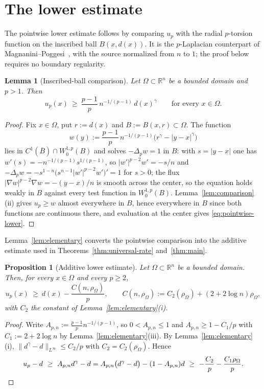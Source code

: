\documentclass[11pt]{article}
\newcommand{\R}{\mathbb R}
\newcommand{\abs}[1]{\lvert #1\rvert}
\newcommand{\norm}[1]{\lVert #1\rVert}
\newtheorem{lemma}[theorem]{Lemma}
\newtheorem{proposition}[theorem]{Proposition}
\theoremstyle{definition}
\theoremstyle{remark}
\begin{document}
\section{The lower estimate}\label{sec:lower}
The pointwise lower estimate follows by comparing $u_p$ with the radial
$p$-torsion function on the inscribed ball $B(x,d(x))$. It is the
$p$-Laplacian counterpart of Magnanini--Poggesi~\cite[Lemma~4.1]{MP}, with the
source normalized from $n$ to $1$; the proof below requires no boundary
regularity.
\begin{lemma}[Inscribed-ball comparison]\label{lem:ball-comparison}
Let $\Omega\subset\R^n$ be a bounded domain and $p>1$. Then
\begin{equation}\label{eq:pointwise-lower}
u_p(x)\ \ge\ \frac{p-1}{p}\,n^{-1/(p-1)}\,d(x)^{\gamma}
\qquad\text{for every }x\in\Omega.
\end{equation}
\end{lemma}
\begin{proof}
Fix $x\in\Omega$, put $r:=d(x)$ and $B:=B(x,r)\subset\Omega$. The function
\[
w(y):=\frac{p-1}{p}\,n^{-1/(p-1)}\bigl(r^{\gamma}-\abs{y-x}^{\gamma}\bigr)
\]
lies in $C^1(\overline B)\cap W^{1,p}_0(B)$ and solves $-\Delta_pw=1$ in $B$:
with $s=\abs{y-x}$ one has $w'(s)=-n^{-1/(p-1)}s^{1/(p-1)}$, so
$\abs{w'}^{p-2}w'=-s/n$ and
$-\Delta_pw=-s^{1-n}\bigl(s^{n-1}\abs{w'}^{p-2}w'\bigr)'=1$ for $s>0$; the
flux $\abs{\nabla w}^{p-2}\nabla w=-(y-x)/n$ is smooth across the center, so
the equation holds weakly in $B$ against every test function in
$W^{1,p}_0(B)$. Lemma~\ref{lem:comparison}(ii) gives $u_p\ge w$ almost
everywhere in $B$, hence everywhere in $B$ since both functions are
continuous there, and evaluation at the center gives
\eqref{eq:pointwise-lower}.
\end{proof}

Lemma~\ref{lem:elementary} converts the pointwise comparison into the
additive estimate used in Theorems~\ref{thm:universal-rate} and~\ref{thm:main}.
\begin{proposition}[Additive lower estimate]\label{thm:lower}
Let $\Omega\subset\R^n$ be a bounded domain. Then, for every $x\in\Omega$ and
every $p\ge2$,
\[
u_p(x)\ \ge\ d(x)-\frac{C(n,\rho_\Omega)}{p},
\qquad
C(n,\rho_\Omega):=C_2(\rho_\Omega)+(2+2\log n)\rho_\Omega ,
\]
with $C_2$ the constant of Lemma~\ref{lem:elementary}\emph{(i)}.
\end{proposition}
\begin{proof}
Write $A_{p,n}:=\frac{p-1}{p}n^{-1/(p-1)}$, so $0<A_{p,n}\le1$ and
$A_{p,n}\ge1-C_1/p$ with $C_1:=2+2\log n$ by
Lemma~\ref{lem:elementary}(iii). By Lemma~\ref{lem:elementary}(i),
$\norm{d^{\gamma}-d}_{L^\infty}\le C_2/p$ with $C_2=C_2(\rho_\Omega)$. Hence
\[
u_p-d\ \ge\ A_{p,n}d^{\gamma}-d
=A_{p,n}\bigl(d^{\gamma}-d\bigr)-(1-A_{p,n})d
\ \ge\ -\frac{C_2}{p}-\frac{C_1\rho_\Omega}{p}. \qedhere
\]
\end{proof}
\end{document}
